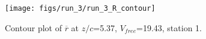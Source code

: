 \begin{figure}[H]
\centering
\texttt{[image: figs/run\_3/run\_3\_R\_contour]}
\caption{Contour plot of $\overline{r}$ at $z/c$=5.37, $V_{free}$=19.43, station 1.}
\label{fig:run_3_R_contour}
\end{figure}


